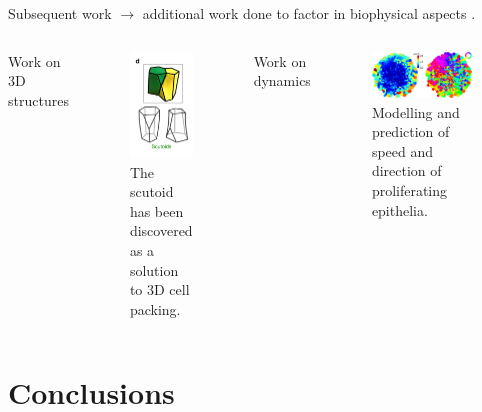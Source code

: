 \documentclass[aspectratio=169, 10pt]{beamer}
\begin{document}
\begin{frame}[fragile]{Subsequent work}
$\rightarrow$ additional work done to factor in biophysical aspects \cite{farhadifar2007influence}.
 \begin{columns}[T,onlytextwidth]
    Work on 3D structures
    \begin{figure}
      \centering
      \includegraphics[width=.3\textwidth]{presentation/figures/scutoids.png}
      \caption{The scutoid has been discovered as a solution to 3D cell packing.\cite{gomez2018scutoids}}
    \end{figure}
    Work on dynamics
    \begin{figure}
      \centering
      \includegraphics[width=\textwidth]{presentation/figures/Cell_Dynamics.jpg}
      \caption{Modelling and prediction of speed and direction of proliferating epithelia. \cite{aland2015mechanistic}}
      \label{}
    \end{figure}
  \end{columns}
\end{frame}

\section{Conclusions}
\end{document}
